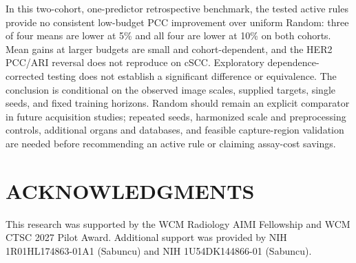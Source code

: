 \documentclass[]{spie}
\begin{document}
In this two-cohort, one-predictor retrospective benchmark, the tested active rules provide no consistent low-budget PCC improvement over uniform Random: three of four means are lower at 5\% and all four are lower at 10\% on both cohorts. Mean gains at larger budgets are small and cohort-dependent, and the HER2 PCC/ARI reversal does not reproduce on cSCC. Exploratory dependence-corrected testing does not establish a significant difference or equivalence. The conclusion is conditional on the observed image scales, supplied targets, single seeds, and fixed training horizons. Random should remain an explicit comparator in future acquisition studies; repeated seeds, harmonized scale and preprocessing controls, additional organs and databases, and feasible capture-region validation are needed before recommending an active rule or claiming assay-cost savings.

\section*{ACKNOWLEDGMENTS}
This research was supported by the WCM Radiology AIMI Fellowship and WCM CTSC 2027 Pilot Award. Additional support was provided by NIH 1R01HL174863-01A1 (Sabuncu) and NIH 1U54DK144866-01 (Sabuncu).



\end{document}
